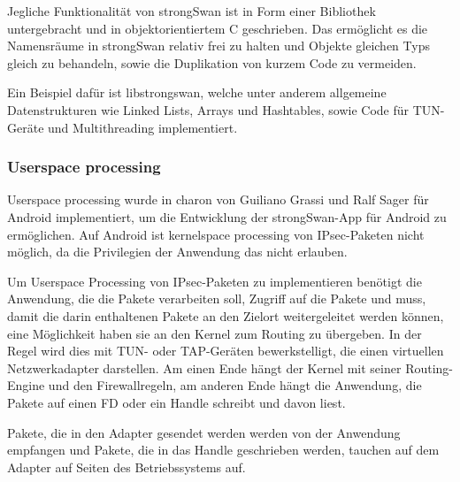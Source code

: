 Jegliche Funktionalität von strongSwan ist in Form einer Bibliothek untergebracht und in objektorientiertem
C geschrieben. Das ermöglicht es die Namensräume in strongSwan relativ frei zu halten
und Objekte gleichen Typs gleich zu behandeln, sowie die Duplikation von kurzem Code
zu vermeiden.

Ein Beispiel dafür ist libstrongswan, welche unter anderem 
allgemeine Datenstrukturen wie Linked Lists, Arrays und Hashtables, sowie Code für TUN-Geräte und
Multithreading implementiert.

\subsubsection{Userspace processing}
Userspace processing wurde in charon von Guiliano Grassi und Ralf Sager für Android implementiert,
um die Entwicklung der strongSwan-App für Android zu ermöglichen. Auf Android ist kernelspace processing
von \ac{IPsec}-Paketen nicht möglich, da die Privilegien der Anwendung das nicht erlauben.

Um Userspace Processing von \ac{IPsec}-Paketen zu implementieren benötigt
die Anwendung, die die Pakete verarbeiten soll, Zugriff auf die Pakete und muss,
damit die darin enthaltenen Pakete an den Zielort weitergeleitet werden können,
eine Möglichkeit haben sie an den Kernel zum Routing zu übergeben. In der Regel wird
dies mit TUN- oder TAP-Geräten bewerkstelligt, die einen virtuellen Netzwerkadapter
darstellen. Am einen Ende hängt der Kernel mit seiner Routing-Engine und den Firewallregeln,
am anderen Ende hängt die Anwendung, die Pakete auf einen \ac{FD} oder ein Handle schreibt
und davon liest.

Pakete, die in den Adapter gesendet werden werden von der Anwendung empfangen
und Pakete, die in das Handle geschrieben werden, tauchen auf dem Adapter auf Seiten
des Betriebssystems auf.

